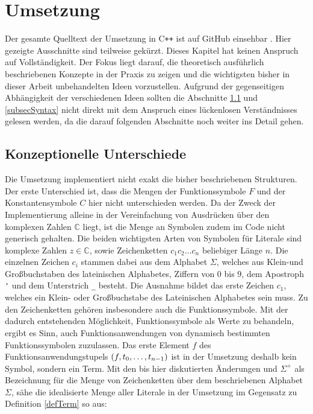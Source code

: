

\chapter{Umsetzung} \label{secKernUmsetzungInCpp}

Der gesamte Quelltext der Umsetzung in C\texttt{++} ist auf GitHub einsehbar \cite{brunizzl2021Jul}. Hier gezeigte Ausschnitte sind teilweise gekürzt.
Dieses Kapitel hat keinen Anspruch auf Vollständigkeit. Der Fokus liegt darauf, die theoretisch ausführlich beschriebenen Konzepte in der Praxis zu zeigen und die wichtigsten bisher in dieser Arbeit unbehandelten Ideen vorzustellen. Aufgrund der gegenseitigen Abhängigkeit der verschiedenen Ideen sollten die Abschnitte \ref{subsecKonzeptionelleUnterschiede} und \ref{subsecSyntax} nicht direkt mit dem Anspruch eines lückenlosen Verständnisses gelesen werden, da die darauf folgenden Abschnitte noch weiter ins Detail gehen.

\section{Konzeptionelle Unterschiede} \label{subsecKonzeptionelleUnterschiede}
Die Umsetzung implementiert nicht exakt die bisher beschriebenen Strukturen. Der erste Unterschied ist, dass die Mengen der Funktionssymbole $F$ und der Konstantensymbole $C$ hier nicht unterschieden werden. Da der Zweck der Implementierung alleine in der Vereinfachung von Ausdrücken über den komplexen Zahlen $\mathbb C$ liegt, ist die Menge an Symbolen zudem im Code nicht generisch gehalten. Die beiden wichtigsten Arten von Symbolen für Literale sind komplexe Zahlen $z \in \mathbb C$, sowie Zeichenketten $c_1 c_2\dots c_n$ beliebiger Länge $n$. Die einzelnen Zeichen $c_i$ stammen dabei aus dem Alphabet $\Sigma$, welches aus Klein-und Großbuchstaben des lateinischen Alphabetes, Ziffern von $0$ bis $9$, dem Apostroph \verb|'| und dem Unterstrich \verb|_| besteht. Die Ausnahme bildet das erste Zeichen $c_1$, welches ein Klein- oder Großbuchstabe des Lateinischen Alphabetes sein muss. Zu den Zeichenketten gehören insbesondere auch die Funktionssymbole. Mit der dadurch entstehenden Möglichkeit, Funktionssymbole als Werte zu behandeln, ergibt es Sinn, auch Funktionsanwendungen von dynamisch bestimmten Funktionssymbolen zuzulassen. Das erste Element $f$ des Funktionsanwendungstupels $(f, {t}_{0}, \dots, {t}_{n-1})$ ist in der Umsetzung deshalb kein Symbol, sondern ein Term. Mit den bis hier diskutierten Änderungen und $\Sigma^+$ als Bezeichnung für die Menge von Zeichenketten über dem beschriebenen Alphabet $\Sigma$, sähe die idealisierte Menge aller Literale in der Umsetzung im Gegensatz zu Definition \ref{defTerm} so aus:


